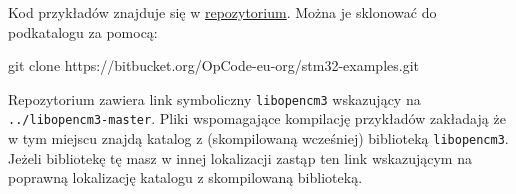 Kod przykładów znajduje się w \hyperref[repo]{repozytorium}. Można je sklonować do podkatalogu za pomocą:

\begin{CodeFrame*}[bash]{}
  git clone https://bitbucket.org/OpCode-eu-org/stm32-examples.git
\end{CodeFrame*}

Repozytorium zawiera link symboliczny \Verb$libopencm3$ wskazujący na \Verb$../libopencm3-master$.
Pliki wspomagające kompilację przykładów zakładają że w tym miejscu znajdą katalog z (skompilowaną wcześniej) biblioteką \Verb$libopencm3$.
Jeżeli bibliotekę tę masz w innej lokalizacji zastąp ten link wskazującym na poprawną lokalizację katalogu z skompilowaną biblioteką.
